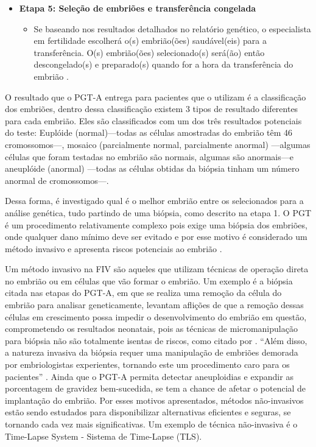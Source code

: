 \begin{itemize}
    \item \textbf{Etapa 5: Seleção de embriões e transferência congelada}
    \begin{itemize}
        \item Se baseando nos resultados detalhados no relatório genético, o especialista em fertilidade escolherá o(s) embrião(ões) saudável(eis) para a transferência. O(s) embrião(ões) selecionado(s) será(ão) então descongelado(s) e preparado(s) quando for a hora da transferência do embrião \cite{cnyfertility2024}. 
    \end{itemize}
\end{itemize}

O resultado que o PGT-A entrega para pacientes que o utilizam é a classificação dos embriões, dentro dessa classificação existem 3 tipos de resultado diferentes para cada embrião. Eles são classificados com um dos três resultados potenciais do teste: Euplóide (normal)—todas as células amostradas do embrião têm 46 cromossomos—, mosaico (parcialmente normal, parcialmente anormal) —algumas células que foram testadas no embrião são normais, algumas são anormais—e aneuplóide (anormal) —todas as células obtidas da biópsia tinham um número anormal de cromossomos—\cite{cnyfertility2024}.



Dessa forma, é investigado qual é o melhor embrião entre os selecionados para a análise genética, tudo partindo de uma biópsia, como descrito na etapa 1. O PGT é um procedimento relativamente complexo pois exige uma biópsia dos embriões, onde qualquer dano mínimo deve ser evitado e por esse motivo é considerado um método invasivo e apresenta riscos potenciais ao embrião \cite{yang2024}.

Um método invasivo na FIV são aqueles que utilizam técnicas de operação direta no embrião ou em células que vão formar o embrião. Um exemplo é a biópsia citada nas etapas do PGT-A, em que se realiza uma remoção da célula do embrião para analisar geneticamente,  levantam aflições de que a remoção dessas células em crescimento possa impedir o desenvolvimento do embrião em questão, comprometendo os resultados neonatais, pois as técnicas de micromanipulação para biópsia não são totalmente isentas de riscos, como citado por . “Além disso, a natureza invasiva da biópsia requer uma manipulação de embriões demorada por embriologistas experientes, tornando este um procedimento caro para os pacientes” \cite{phillips2024, leaver2019}. Ainda que o PGT-A permita detectar aneuploidias e expandir as porcentagem de gravidez bem-sucedida, se tem a chance de afetar o potencial de implantação do embrião. Por esses motivos apresentados, métodos não-invasivos estão sendo estudados para disponibilizar alternativas eficientes e seguras, se tornando cada vez mais significativas. Um exemplo de técnica não-invasiva é o Time-Lapse System {-} Sistema de Time-Lapse (TLS).

